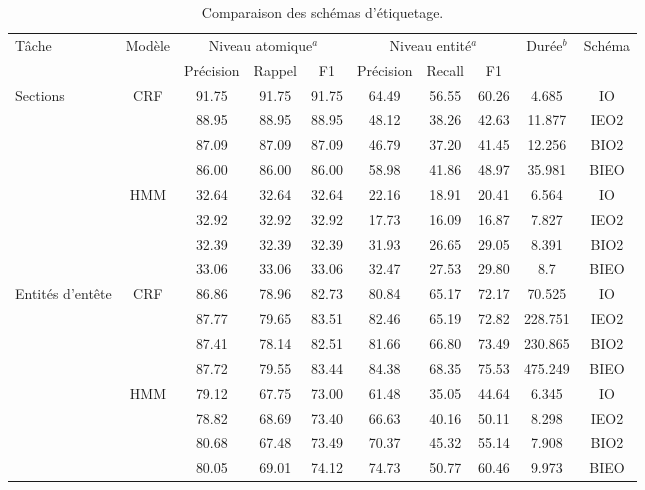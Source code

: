 \begin{table}[h]
\scriptsize
\caption{Comparaison des schémas d'étiquetage.}\label{fig:structuration:select-segm-repr}
\begin{center}
\begin{tabular}{p{0.9cm}|c|cccccccc}
\hline \noalign{\smallskip}
Tâche & Modèle & \multicolumn{3}{c}{Niveau atomique$^a$} & \multicolumn{3}{c}{Niveau entité$^a$} & \multirow{2}{*}{Durée$^b$} & Schéma \\
 & & Précision & Rappel & F1 &  Précision & Recall & F1 &  & \\ \hline %
\multirow{8}{*}{Sections}  & \multirow{4}{*}{CRF} & 91.75 & 91.75 & 91.75 & 64.49 & 56.55 & 60.26 &  4.685  & IO \\
&  & 88.95 & 88.95 & 88.95 & 48.12 & 38.26 & 42.63  & 11.877 & IEO2 \\
&  & 87.09 & 87.09 & 87.09 & 46.79 & 37.20 & 41.45 & 12.256 & BIO2 \\
 &  & 86.00 & 86.00 & 86.00 & 58.98 & 41.86 & 48.97  & 35.981 & BIEO \\ \cline{2-10}
& \multirow{4}{*}{HMM} & 32.64 & 32.64 & 32.64 & 22.16 & 18.91 & 20.41 & 6.564 & IO \\
&  & 32.92 & 32.92 & 32.92 & 17.73 & 16.09 & 16.87  &   7.827  & IEO2 \\
 &  & 32.39 & 32.39 & 32.39 & 31.93 & 26.65 & 29.05 & 8.391 & BIO2 \\
  &  & 33.06 & 33.06 & 33.06 & 32.47 & 27.53 & 29.80 & 8.7 & BIEO \\ \hline %
\multirow{8}{1.5cm}{Entités d'entête}  & \multirow{4}{*}{CRF} & 86.86 & 78.96 & 82.73 & 80.84 & 65.17 & 72.17  & 70.525 & IO \\
 &  & 87.77 & 79.65 & 83.51 & 82.46 & 65.19 & 72.82  & 228.751 & IEO2 \\
 &  & 87.41 & 78.14 & 82.51 & 81.66 & 66.80 & 73.49 & 230.865 & BIO2 \\
 &  & 87.72 & 79.55 & 83.44 & 84.38 & 68.35 & 75.53 &  475.249 & BIEO \\ \cline{2-10}
  & \multirow{4}{*}{HMM} & 79.12 & 67.75 & 73.00 & 61.48 & 35.05 & 44.64 & 6.345 & IO \\
  &  & 78.82 & 68.69 & 73.40 & 66.63 & 40.16 & 50.11& 8.298 & IEO2 \\ 
  &  & 80.68 & 67.48 & 73.49 & 70.37 & 45.32 & 55.14 & 7.908 & BIO2 \\
 &  & 80.05 & 69.01 & 74.12 & 74.73 & 50.77 & 60.46 & 9.973 & BIEO \\ \hline

\end{tabular}
\end{center}
\end{table}
